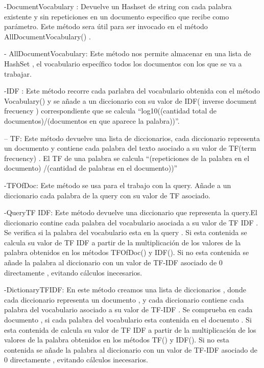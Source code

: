 \documentclass{article}
\begin{document}
\begin{center}
\begin{flushleft}
		-DocumentVocabulary :
		Devuelve un Hashset de string con cada palabra existente y sin repeticiones en un documento especifico que recibe como parámetro.
		Este método sera útil para ser invocado en el método AllDocumentVocabulary() .\vspace{0.5em}
		
		- AllDocumentVocabulary:
		Este método nos permite almacenar en una lista de  HashSet  , el vocabulario específico todos los documentos con los que se va a trabajar.\vspace{0.5em}
		
		-IDF :
		Este método recorre cada parlabra del vocabulario obtenida con el método Vocabulary() y se añade a un diccionario con su valor de IDF( inverse document frecuency ) correspondiente que se calcula “log10((cantidad total de documentos)/(documentos en que aparece la palabra))”.\vspace{0.5em}
		
		– TF:
		Este método devuelve una lista de diccionarios, cada diccionario representa un documento y  contiene cada palabra del texto asociado a su valor de TF(term frecuency) . El TF de una palabra se calcula “(repeticiones de la palabra en el documento) /(cantidad de palabras en el documento))”\vspace{0.5em}
		
		-TFOfDoc:
		Este método se usa para el trabajo con la query. Añade a un diccionario cada palabra de la query con su valor de TF asociado.\vspace{0.5em}
		
		-QueryTF IDF:
		Este método devuelve una diccionario que representa la query.El diccionario contine cada palabra del vocabulario asociada a su valor de TF IDF . Se verifica si la palabra del vocabulario esta en la query . Si esta contenida se calcula su valor de TF IDF a partir de la multiplicación de los valores de la palabra obtenidos en los métodos TFOfDoc() y IDF(). Si no esta contenida se añade la palabra al diccionario con un valor de TF-IDF asociado de 0 directamente , evitando cálculos inecesarios. \vspace{0.5em}
		
		-DictionaryTFIDF:
		En este método creamos una lista de diccionarios , donde cada diccionario representa un documento , y cada diccionario contiene cada palabra del vocabulario asociado a su valor de TF-IDF . Se comprueba en cada documento , si cada palabra del vocabulario esta contenida en el docuemto . Si esta contenida de calcula su valor de TF IDF a partir de la multiplicación de los valores de la palabra obtenidos en los métodos TF() y IDF(). Si no esta contenida se añade la palabra al diccionario con un valor de TF-IDF asociado de 0 directamente , evitando cálculos inecesarios.\vspace{0.5em}
		

\end{flushleft}
\end{center}
\end{document}
